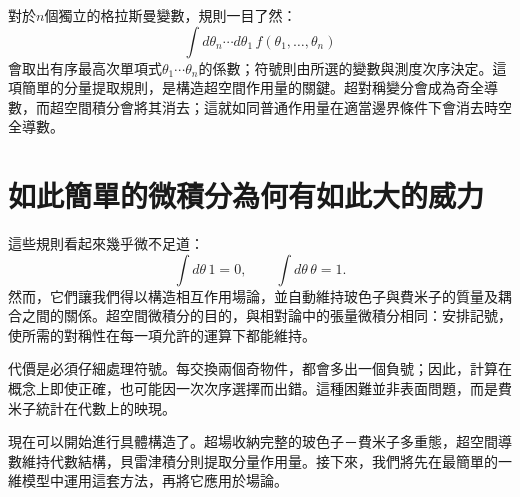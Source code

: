 \begin{classroomqa}
\end{classroomqa}

\begin{classroomqa}
\end{classroomqa}

對於\(n\)個獨立的格拉斯曼變數，規則一目了然：
\begin{equation}
\int d\theta_n\cdots d\theta_1\,
f(\theta_1,\ldots,\theta_n)
\end{equation}
會取出有序最高次單項式\(\theta_1\cdots\theta_n\)的係數；符號則由所選的變數與測度次序決定。這項簡單的分量提取規則，是構造超空間作用量的關鍵。超對稱變分會成為奇全導數，而超空間積分會將其消去；這就如同普通作用量在適當邊界條件下會消去時空全導數。

\section{如此簡單的微積分為何有如此大的威力}

這些規則看起來幾乎微不足道：
\begin{equation}
\int d\theta\,1=0,
\qquad
\int d\theta\,\theta=1.
\end{equation}
然而，它們讓我們得以構造相互作用場論，並自動維持玻色子與費米子的質量及耦合之間的關係。超空間微積分的目的，與相對論中的張量微積分相同：安排記號，使所需的對稱性在每一項允許的運算下都能維持。

代價是必須仔細處理符號。每交換兩個奇物件，都會多出一個負號；因此，計算在概念上即使正確，也可能因一次次序選擇而出錯。這種困難並非表面問題，而是費米子統計在代數上的映現。

\begin{classroomqa}
\end{classroomqa}

現在可以開始進行具體構造了。超場收納完整的玻色子－費米子多重態，超空間導數維持代數結構，貝雷津積分則提取分量作用量。接下來，我們將先在最簡單的一維模型中運用這套方法，再將它應用於場論。
